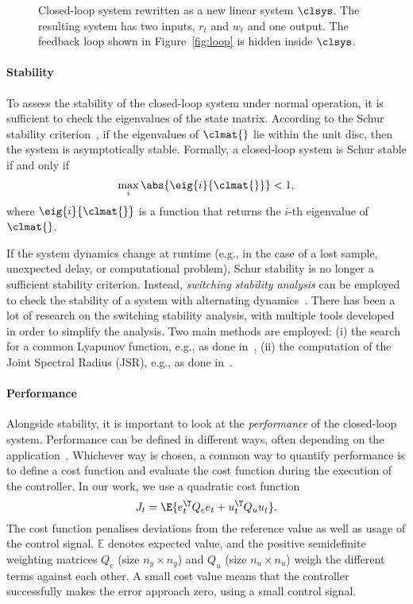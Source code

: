 \begin{figure}[t]
\centering

\caption{Closed-loop system rewritten as a new linear system $\clsys$.
    The resulting system has two inputs, $r_t$ and $w_t$ and one output.
    The feedback loop shown in Figure~\ref{fig:loop} is hidden inside $\clsys$.}
\label{fig:closedloop}
\end{figure}

\paragraph*{Stability}

To assess the stability of the closed-loop system under normal operation, it is sufficient to check the eigenvalues of the state matrix. 
According to the Schur stability criterion~\cite{Astrom:1997}, if the eigenvalues of $\clmat{}$ lie within the unit disc, then the system is asymptotically stable. 
Formally, a closed-loop system is Schur stable if and only if
%
\begin{equation}
    \label{eq:schur}
    \max_i{\abs{\eig{i}{\clmat{}}}} < 1,
\end{equation}
%
where $\eig{i}{\clmat{}}$ is a function that returns the $i$-th eigenvalue of~$\clmat{}$.

If the system dynamics change at runtime (e.g., in the case of a lost sample, unexpected delay, or computational problem), Schur stability is no longer a sufficient stability criterion.
Instead, \emph{switching stability analysis} can be employed to check the stability of a system with alternating dynamics~\cite{Jungers2009}.
There has been a lot of research on the switching stability analysis, with multiple tools developed in order to simplify the analysis.
Two main methods are employed: (i) the search for a common Lyapunov function, e.g., as done in~\cite{Linsenmayer:2017}, (ii) the computation of the Joint Spectral Radius (JSR), e.g., as done in~\cite{Maggio:2020,Jungers:2014}.

\paragraph*{Performance}

Alongside stability, it is important to look at the \emph{performance} of the closed-loop system.
Performance can be defined in different ways, often depending on the application~\cite{Astrom:2006}.
Whichever way is chosen, a common way to quantify performance is to define a cost function and evaluate the cost function during the execution of the controller.
In our work, we use a quadratic cost function
%
\begin{equation}
    \label{eq:cost}
    J_t = \E{e_t^\T Q_e e_t + u_t^\T Q_u u_t}.
\end{equation}
%
The cost function penalises deviations from the reference value as well as usage of the control signal.
$\mathbb{E}$ denotes expected value, and the positive semidefinite weighting matrices $Q_e$ (size $n_y \times n_y$) and $Q_u$ (size $n_u \times n_u$) weigh the different terms against each other.
A small cost value means that the controller successfully makes the error approach zero, using a small control signal.

